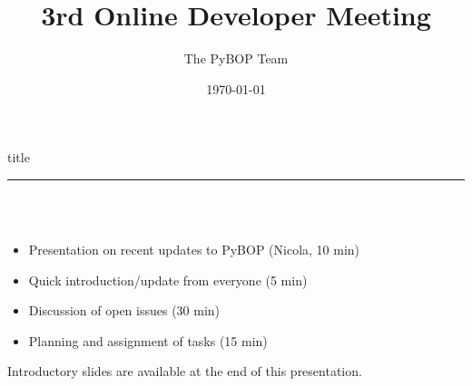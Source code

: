 \documentclass[aspectratio=169]{beamer}
\title{3rd Online Developer Meeting}
\author{The PyBOP Team \texorpdfstring{\href{https://github.com/pybop-team/PyBOP}{\faGithub}}{}}
\institute{}
\date{\today}
\begin{document}
{ 
%
\frame{\titlepage}}


\begin{frame}[plain]
    \centering
    \begin{beamercolorbox}[sep=8pt,center,shadow=true,rounded=true]{title}
    \par%
    \color{oxfordblue}\noindent\rule{10cm}{1pt} \\
    \LARGE{\faFileTextO} \\
    \vspace{6mm} \normalsize
    \begin{itemize}
        \item Presentation on recent updates to PyBOP (Nicola, 10 min)
        \item Quick introduction/update from everyone (5 min)
        \item Discussion of open issues (30 min)
        \item Planning and assignment of tasks (15 min)
    \end{itemize}
    \end{beamercolorbox}
    Introductory slides are available at the end of this presentation.
\end{frame}
\end{document}

